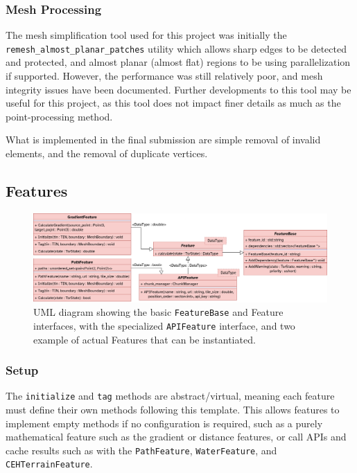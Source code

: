\documentclass[12pt]{article}
\begin{document}
\subsubsection{Mesh Processing}

The mesh simplification tool used for this project was initially the \texttt{remesh\_almost\_planar\_patches} utility which allows sharp edges to be detected and protected, and almost planar (almost flat) regions to be using parallelization if supported. However, the performance was still relatively poor, and mesh integrity issues have been documented. Further developments to this tool may be useful for this project, as this tool does not impact finer details as much as the point-processing method.

What is implemented in the final submission are simple removal of invalid elements, and the removal of duplicate vertices.

\subsection{Features}

\begin{figure}[H]
  \centering
  \includegraphics[width=\textwidth]{assets/FeatureBase.png}
  \caption{UML diagram showing the basic \texttt{FeatureBase} and Feature interfaces, with the specialized \texttt{APIFeature} interface, and two example of actual Features that can be instantiated.}\label{impl:features:uml}
\end{figure}

\subsubsection{Setup}

The \texttt{initialize} and \texttt{tag} methods are abstract/virtual, meaning each feature must define their own methods following this template. This allows features to implement empty methods if no configuration is required, such as a purely mathematical feature such as the gradient or distance features, or call APIs and cache results such as with the \texttt{PathFeature}, \texttt{WaterFeature}, and \texttt{CEHTerrainFeature}.
\end{document}
